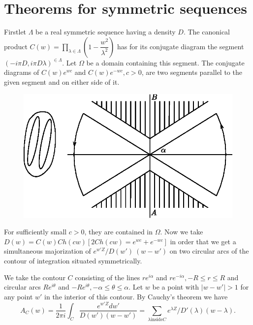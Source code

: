 \section{Theorems for symmetric sequences}\label{chap15:sec2}%

First\pageoriginale let $\Lambda$ be a real symmetric sequence having a density
$D$. The canonical product $C(w) = \prod\limits_{\lambda \in \Lambda}
(1 - \dfrac{w^2}{\lambda^2})$ has for its conjugate diagram the
segment $(- i \pi D, i \pi D\lambda)^{\in \Lambda}$. Let $\Omega$ be
a domain containing this segment. The conjugate diagrams of $C(w) e^{w
 c}$ and $C(w) e^{-wc}, c > 0$, are two segments parallel to the
given segment and on either side of it. 

 \begin{figure}[H]
 \centerline{\includegraphics{vol15-figures/fig15-15.eps}}
 \end{figure}

For sufficiently small $c>0$, they are contained in $\Omega$. Now we
take $D(w) = C(w) Ch(cw) [ 2Ch(cw) = e^{wc} + e^{-wc}]$ in order that
we get a simultaneous majorization of $e^{w' Z}/ D(w') ~ (w-w')$ on
two circular arcs of the contour of integration situated
symmetrically. 

We take the contour $C$ consisting of the lines $re^{i \alpha}$ and
$re^{- i \alpha}, -R \le r \le R$ and circular arcs $Re^{i \theta} $
and $-Re^{i \theta}, - \alpha \le \theta \le \alpha$. Let $w$ be a
point with $\big | w - w' \big | > 1$ for any point $w'$ in the
interior of this contour. By Cauchy's theorem we have 
$$
A_C (w) = \frac{1}{2 \pi i} \int_C \frac{e^{w' Z} dw'}{D (w') (w-w')}
= \sum_{\lambda \text {inside} C} e^{\lambda Z}/D' (\lambda) (w-
\lambda). 
$$ 

